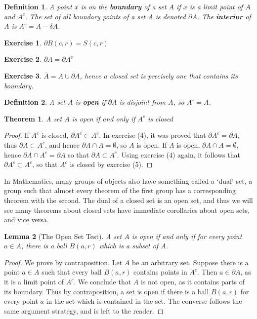 \documentclass{report}
\newtheorem{theorem}{Theorem}[chapter]
\newtheorem{lemma}[theorem]{Lemma}
\newtheorem{definition}{Definition}
\newtheorem{exercise}{Exercise}
\begin{document}
\begin{definition}
  A point $x$ is on the {\bf boundary} of a set $A$ if $x$ is a limit point of $A$ and $A^c$. The set of all boundary points of a set $A$ is denoted $\partial A$. The {\bf interior} of $A$ is $A^\circ = A - \delta A$.
\end{definition}

\begin{exercise}
  $\partial B(c,r) = S(c,r)$
\end{exercise}

\begin{exercise}
  $\partial A = \partial A^c$
\end{exercise}

\begin{exercise}
  $\overline{A} = A \cup \partial A$, hence a closed set is precisely one that contains its boundary.
\end{exercise}

\begin{definition}
  A set $A$ is {\bf open} if $\partial A$ is disjoint from $A$, so $A^\circ = A$.
\end{definition}

\begin{theorem}
  A set $A$ is open if and only if $A^c$ is closed
\end{theorem}
\begin{proof}
  If $A^c$ is closed, $\partial A^c \subset A^c$. In exercise (4), it was proved that $\partial A^c = \partial A$, thus $\partial A \subset A^c$, and hence $\partial A \cap A = \emptyset$, so $A$ is open. If $A$ is open, $\partial A \cap A = \emptyset$, hence $\partial A \cap A^c = \partial A$ so that $\partial A \subset A^c$. Using exercise (4) again, it follows that $\partial A^c \subset A^c$, so that $A^c$ is closed by exercise (5). 
\end{proof}

In Mathematics, many groups of objects also have something called a `dual' set, a group such that almost every theorem of the first group has a corresponding theorem with the second. The dual of a closed set is an open set, and thus we will see many theorems about closed sets have immediate corollaries about open sets, and vice versa.

\begin{lemma}[The Open Set Test]
  A set $A$ is open if and only if for every point $a \in A$, there is a ball $B(a,r)$ which is a subset of $A$.
\end{lemma}
\begin{proof}
  We prove by contraposition. Let $A$ be an arbitrary set. Suppose there is a point $a \in A$ such that every ball $B(a,r)$ contains points in $A^c$. Then $a \in \partial A$, as it is a limit point of $A^c$. We conclude that $A$ is not open, as it contains parts of its boundary. Thus by contraposition, a set is open if there is a ball $B(a,r)$ for every point $a$ in the set which is contained in the set. The converse follows the same argument strategy, and is left to the reader.
\end{proof}
\end{document}
